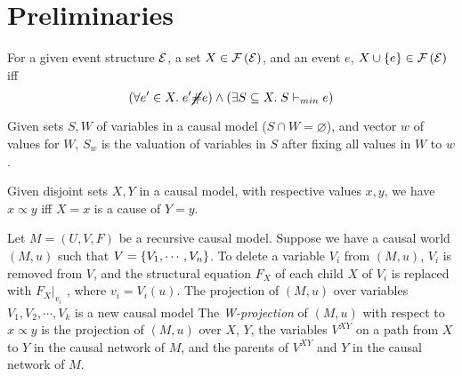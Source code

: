 \section{Preliminaries}

\begin{prop}\label{prop:es-induction}
  For a given event structure $\mathcal{E}$, a set $X \in \mathcal{F} \left( \mathcal{E} \right)$,
  and an event $e$, $X \cup \left\{ e \right\} \in \mathcal{F} \left( \mathcal{E} \right)$ iff
  \[ ( \forall e' \in X.\; e' \cancel{\#} e ) \wedge
    ( \exists S \subseteq X.\; S \vdash_{min} e ) \]
\end{prop}

\begin{defn}
  Given sets $S, W$ of variables in a causal model
  ($S \cap W = \varnothing$), and vector $w$ of values for $W$,
  $S_w$ is the valuation of variables in $S$
  after fixing all values in $W$ to $w$.
\end{defn}

\begin{defn}
  Given disjoint sets $X,Y$ in a causal model, with respective values $x,y$,
  we have $x \propto y$ iff $X=x$ is a cause of $Y=y$.
\end{defn}

\begin{defn}\label{defn:W-projection}
  Let $M =(U,V,F)$ be a recursive causal model.
  Suppose we have a causal world $(M,u)$ such that $V = \left\{ V_1, \cdots, V_n \right\}$.
  To delete a variable $V_i$ from $(M,u)$, $V_i$ is removed from $V$,
  and the structural equation $F_X$ of each child $X$ of $V_i$
  is replaced with $F_X |_{v_i}$ , where $v_i = V_i(u)$.
  The projection of $(M,u)$ over variables $V_1, V_2, \cdots, V_k$ is a new causal model
  The \textit{W-projection} of $(M,u)$ with respect to $x \propto y$
  is the projection of $(M, u)$ over $X$, $Y$, the variables $V^{XY}$
  on a path from $X$ to $Y$ in the causal network of $M$,
  and the parents of $V^{XY}$ and $Y$ in the causal network of $M$.
\end{defn}